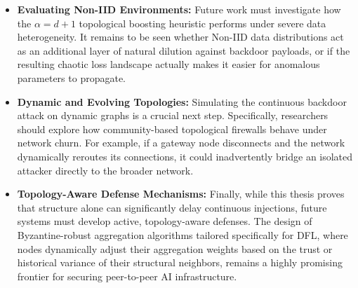 \begin{itemize}
    \item \textbf{Evaluating Non-IID Environments:} Future work must investigate how the $\alpha=d+1$ topological boosting heuristic performs under severe data heterogeneity. It remains to be seen whether Non-IID data distributions act as an additional layer of natural dilution against backdoor payloads, or if the resulting chaotic loss landscape actually makes it easier for anomalous parameters to propagate.
    \item \textbf{Dynamic and Evolving Topologies:} Simulating the continuous backdoor attack on dynamic graphs is a crucial next step. Specifically, researchers should explore how community-based topological firewalls behave under network churn. For example, if a gateway node disconnects and the network dynamically reroutes its connections, it could inadvertently bridge an isolated attacker directly to the broader network.
    \item \textbf{Topology-Aware Defense Mechanisms:} Finally, while this thesis proves that structure alone can significantly delay continuous injections, future systems must develop active, topology-aware defenses. The design of Byzantine-robust aggregation algorithms tailored specifically for DFL, where nodes dynamically adjust their aggregation weights based on the trust or historical variance of their structural neighbors, remains a highly promising frontier for securing peer-to-peer AI infrastructure.
\end{itemize}